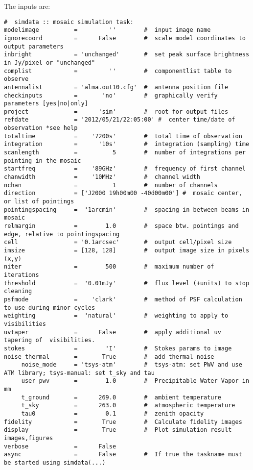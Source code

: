 The inputs are:
\small
\begin{verbatim}
#  simdata :: mosaic simulation task:
modelimage          =         ''        #  input image name
ignorecoord         =      False        #  scale model coordinates to output parameters
inbright            = 'unchanged'       #  set peak surface brightness in Jy/pixel or "unchanged"
complist            =         ''        #  componentlist table to observe
antennalist         = 'alma.out10.cfg'  #  antenna position file
checkinputs         =       'no'        #  graphically verify parameters [yes|no|only]
project             =      'sim'        #  root for output files
refdate             = '2012/05/21/22:05:00' #  center time/date of observation *see help
totaltime           =    '7200s'        #  total time of observation
integration         =      '10s'        #  integration (sampling) time
scanlength          =          5        #  number of integrations per pointing in the mosaic
startfreq           =    '89GHz'        #  frequency of first channel
chanwidth           =    '10MHz'        #  channel width
nchan               =          1        #  number of channels
direction           = ['J2000 19h00m00 -40d00m00'] #  mosaic center, or list of pointings
pointingspacing     =  '1arcmin'        #  spacing in between beams in mosaic
relmargin           =        1.0        #  space btw. pointings and edge, relative to pointingspacing
cell                = '0.1arcsec'       #  output cell/pixel size
imsize              = [128, 128]        #  output image size in pixels (x,y)
niter               =        500        #  maximum number of iterations
threshold           =  '0.01mJy'        #  flux level (+units) to stop cleaning
psfmode             =    'clark'        #  method of PSF calculation to use during minor cycles
weighting           =  'natural'        #  weighting to apply to visibilities
uvtaper             =      False        #  apply additional uv tapering of  visibilities.
stokes              =        'I'        #  Stokes params to image
noise_thermal       =       True        #  add thermal noise
     noise_mode     = 'tsys-atm'        #  tsys-atm: set PWV and use ATM library; tsys-manual: set t_sky and tau
     user_pwv       =        1.0        #  Precipitable Water Vapor in mm
     t_ground       =      269.0        #  ambient temperature
     t_sky          =      263.0        #  atmospheric temperature
     tau0           =        0.1        #  zenith opacity
fidelity            =       True        #  Calculate fidelity images
display             =       True        #  Plot simulation result images,figures
verbose             =      False        
async               =      False        #  If true the taskname must be started using simdata(...)

\end{verbatim}
\normalsize

